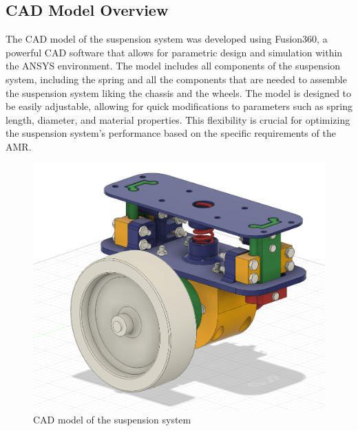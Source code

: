 \documentclass[11pt]{article}
\begin{document}
\newpage

\subsection{CAD Model Overview}
The CAD model of the suspension system was developed using Fusion360, a powerful CAD software that allows for parametric design and simulation within the ANSYS environment. The model includes all components of the suspension system, including the spring and all the components that are needed to assemble the suspension system liking the chassis and the wheels. The model is designed to be easily adjustable, allowing for quick modifications to parameters such as spring length, diameter, and material properties. This flexibility is crucial for optimizing the suspension system's performance based on the specific requirements of the AMR.

\begin{figure}[H]
    \centering
    \includegraphics[width=\textwidth]{images/CAD design/Suspension.png}
    \caption{CAD model of the suspension system}
    \label{fig:cad_model}
\end{figure}
\end{document}
